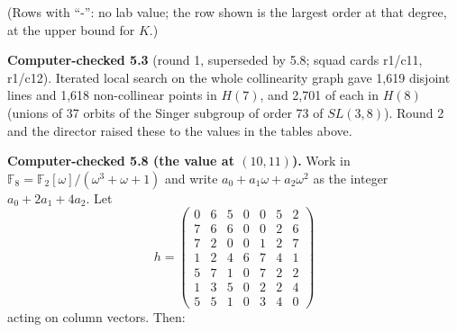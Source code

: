 \documentclass[
  10pt,
]{article}
\begin{document}
(Rows with ``-'': no lab value; the row shown is the largest order at
that degree, at the upper bound for \(K\).)

\textbf{Computer-checked 5.3} (round 1, superseded by 5.8; squad cards
r1/c11, r1/c12). Iterated local search on the whole collinearity graph
gave 1,619 disjoint lines and 1,618 non-collinear points in \(H(7)\),
and 2,701 of each in \(H(8)\) (unions of 37 orbits of the Singer
subgroup of order 73 of \(SL(3,8)\)). Round 2 and the director raised
these to the values in the tables above.

\textbf{Computer-checked 5.8 (the value at \((10,11)\)).} Work in
\(\mathbb F_8 = \mathbb F_2[\omega]/(\omega^3+\omega+1)\) and write
\(a_0+a_1\omega+a_2\omega^2\) as the integer \(a_0+2a_1+4a_2\). Let
\[h = \begin{pmatrix}
0&6&5&0&0&5&2\\ 7&6&6&0&0&2&6\\ 7&2&0&0&1&2&7\\ 1&2&4&6&7&4&1\\ 5&7&1&0&7&2&2\\ 1&3&5&0&2&2&4\\ 5&5&1&0&3&4&0
\end{pmatrix}\] acting on column vectors. Then:
\end{document}
